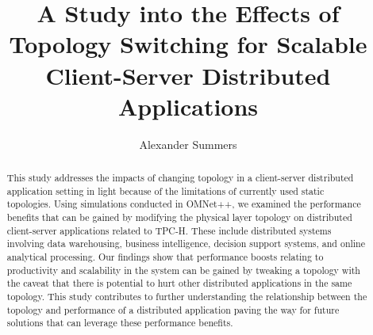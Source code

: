 \documentclass[sigconf]{acmart}
\begin{document}
\title{A Study into the Effects of Topology Switching for Scalable Client-Server Distributed Applications}


\author{}
 \author{Alexander Summers}

\renewcommand{\shortauthors}{Summers}

\begin{abstract}

This study addresses the impacts of changing topology in a client-server distributed application setting in light because of the limitations of currently used static topologies. Using simulations conducted in OMNet++, we examined the performance benefits that can be gained by modifying the physical layer topology on distributed client-server applications related to TPC-H. These include distributed systems involving data warehousing, business intelligence, decision support systems, and online analytical processing. Our findings show that performance boosts relating to productivity and scalability in the system can be gained by tweaking a topology with the caveat that there is potential to hurt other distributed applications in the same topology. This study contributes to further understanding the relationship between the topology and performance of a distributed application paving the way for future solutions that can leverage these performance benefits.



\end{abstract}

\maketitle





\end{document}
